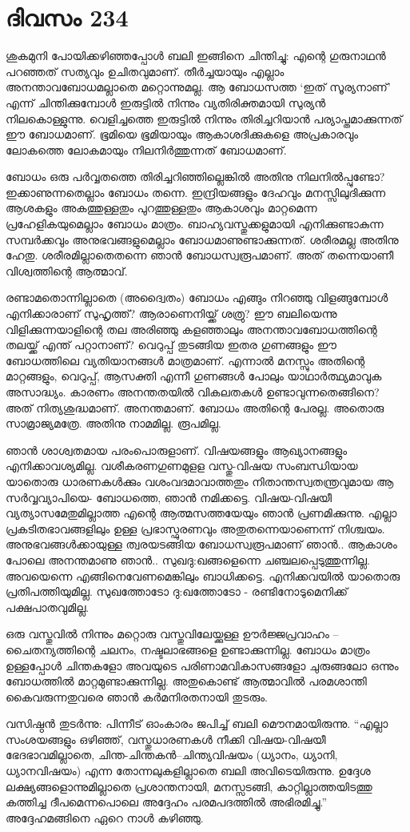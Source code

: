 
\section{ദിവസം 234}


ശുകമുനി പോയിക്കഴിഞ്ഞപ്പോള്‍ ബലി ഇങ്ങിനെ ചിന്തിച്ചു: എന്റെ ഗുരുനാഥന്‍ പറഞ്ഞത് സത്യവും ഉചിതവുമാണ്. തീര്‍ച്ചയായും എല്ലാം അനന്താവബോധമല്ലാതെ മറ്റൊന്നുമല്ല. ആ ബോധസത്ത ‘ഇത് സൂര്യനാണ്’ എന്ന് ചിന്തിക്കുമ്പോള്‍ ഇരുട്ടില്‍ നിന്നും വ്യതിരിക്തമായി സുര്യന്‍ നിലകൊള്ളുന്നു. വെളിച്ചത്തെ ഇരുട്ടില്‍ നിന്നും തിരിച്ചറിയാന്‍ പര്യാപ്തമാക്കുന്നത് ഈ ബോധമാണ്. ഭൂമിയെ ഭൂമിയായും ആകാശദിക്കുകളെ അപ്രകാരവും ലോകത്തെ ലോകമായും നിലനിര്‍ത്തുന്നത് ബോധമാണ്.  

ബോധം ഒരു പര്‍വ്വതത്തെ തിരിച്ചറിഞ്ഞില്ലെങ്കില്‍ അതിനു നിലനില്‍പ്പുണ്ടോ? ഇക്കാണുന്നതെല്ലാം ബോധം തന്നെ. ഇന്ദ്രിയങ്ങളും ദേഹവും മനസ്സിലുദിക്കുന്ന ആശകളും അകത്തുള്ളതും പുറത്തുള്ളതും ആകാശവും മാറ്റമെന്ന പ്രഹേളികയുമെല്ലാം ബോധം മാത്രം. ബാഹ്യവസ്തുക്കളുമായി എനിക്കുണ്ടാകുന്ന സമ്പര്‍ക്കവും അനുഭവങ്ങളുമെല്ലാം ബോധമാണുണ്ടാക്കുന്നത്. ശരീരമല്ല അതിനു ഹേതു. ശരീരമില്ലാതെതന്നെ ഞാന്‍ ബോധസ്വരൂപമാണ്. അത് തന്നെയാണീ വിശ്വത്തിന്റെ ആത്മാവ്.

രണ്ടാമതൊന്നില്ലാതെ (അദ്വൈതം) ബോധം എങ്ങും നിറഞ്ഞു വിളങ്ങുമ്പോള്‍ എനിക്കാരാണ് സുഹൃത്ത്? ആരാണെനിയ്ക്ക് ശത്രു? ഈ ബലിയെന്നു വിളിക്കുന്നയാളിന്റെ തല അരിഞ്ഞു കളഞ്ഞാലും അനന്താവബോധത്തിന്റെ തലയ്ക്ക് എന്ത് പറ്റാനാണ്? വെറുപ്പ് തുടങ്ങിയ ഇതര ഗുണങ്ങളും ഈ ബോധത്തിലെ വ്യതിയാനങ്ങള്‍ മാത്രമാണ്. എന്നാല്‍ മനസ്സും അതിന്റെ മാറ്റങ്ങളും, വെറുപ്പ്, ആസക്തി എന്നീ ഗുണങ്ങള്‍ പോലും യാഥാര്‍ത്ഥ്യമാവുക അസാദ്ധ്യം. കാരണം അനന്തതയില്‍ വികലതകള്‍ ഉണ്ടാവുന്നതെങ്ങിനെ? അത് നിത്യശുദ്ധമാണ്. അനന്തമാണ്‌. ബോധം അതിന്റെ പേരല്ല. അതൊരു സാമ്രാജ്യമത്രേ. അതിനു നാമമില്ല. രൂപമില്ല.

ഞാന്‍ ശാശ്വതമായ പരംപൊരുളാണ്. വിഷയങ്ങളും ആഖ്യാനങ്ങളും എനിക്കാവശ്യമില്ല. വശീകരണഗുണമുളള വസ്തു-വിഷയ സംബന്ധിയായ യാതൊരു ധാരണകള്‍ക്കും വശംവദമാവാത്തതും നിതാന്തസ്വതന്ത്രവുമായ ആ സര്‍വ്വവ്യാപിയെ- ബോധത്തെ, ഞാന്‍ നമിക്കട്ടെ. വിഷയ-വിഷയീ വ്യത്യാസമേതുമില്ലാത്ത എന്റെ ആത്മസത്തയേയും ഞാന്‍ പ്രണമിക്കുന്നു. എല്ലാ പ്രകടിതഭാവങ്ങളിലും ഉള്ള പ്രഭാസ്ഫുരണവും അതുതന്നെയാണെന്ന് നിശ്ചയം. അനുഭവങ്ങള്‍ക്കായുള്ള ത്വരയടങ്ങിയ ബോധസ്വരൂപമാണ് ഞാന്‍.. ആകാശം പോലെ അനന്തമാണു ഞാന്‍.. സുഖദു:ഖങ്ങളെന്നെ ചഞ്ചലപ്പെടുത്തുന്നില്ല. അവയെന്നെ എങ്ങിനെവേണമെങ്കിലും ബാധിക്കട്ടെ. എനിക്കവയില്‍ യാതൊരു പ്രതിപത്തിയുമില്ല. സുഖത്തോടോ ദു:ഖത്തോടോ - രണ്ടിനോടുമെനിക്ക് പക്ഷപാതവുമില്ല.

ഒരു വസ്തുവില്‍ നിന്നും മറ്റൊരു വസ്തുവിലേയ്ക്കുള്ള ഊര്‍ജ്ജപ്രവാഹം – ചൈതന്യത്തിന്റെ ചലനം, നഷ്ടലാഭങ്ങളെ ഉണ്ടാക്കുന്നില്ല. ബോധം മാത്രം ഉള്ളപ്പോള്‍ ചിന്തകളോ അവയുടെ പരിണാമവികാസങ്ങളോ ചുരുങ്ങലോ ഒന്നും  ബോധത്തില്‍ മാറ്റമുണ്ടാക്കുന്നില്ല. അതുകൊണ്ട് ആത്മാവില്‍ പരമശാന്തി കൈവരുന്നതുവരെ ഞാന്‍ കര്‍മനിരതനായി തുടരും. 

വസിഷ്ഠന്‍ തുടര്‍ന്നു: പിന്നീട്  ഓംകാരം ജപിച്ച് ബലി മൌനമായിരുന്നു. “എല്ലാ സംശയങ്ങളും ഒഴിഞ്ഞ്, വസ്തുധാരണകള്‍ നീക്കി വിഷയ-വിഷയീ ഭേദഭാവമില്ലാതെ, ചിന്ത-ചിന്തകന്‍--ചിന്ത്യവിഷയം (ധ്യാനം, ധ്യാനി, ധ്യാനവിഷയം) എന്ന തോന്നലുകളില്ലാതെ ബലി അവിടെയിരുന്നു. ഉദ്ദേശ ലക്ഷ്യങ്ങളൊന്നുമില്ലാതെ പ്രശാന്തനായി, മനസ്സടങ്ങി, കാറ്റില്ലാത്തയിടത്തു കത്തിച്ച  ദീപമെന്നപൊലെ അദ്ദേഹം പരമപദത്തില്‍ അഭിരമിച്ചു.” അദ്ദേഹമങ്ങിനെ ഏറെ നാള്‍ കഴിഞ്ഞു. 

